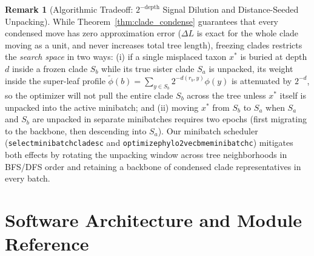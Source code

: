 \documentclass[11pt,a4paper]{article}
\makeatletter
\DeclareRobustCommand{\_}{\ifmmode\nfss@text{\textunderscore}\else\textunderscore\allowbreak\fi}
\theoremstyle{definition}
\newtheorem{remark}[theorem]{Remark}
\makeatother
\begin{document}
\begin{remark}[Algorithmic Tradeoff: $2^{-\text{depth}}$ Signal Dilution and Distance-Seeded Unpacking]
\label{rem:minibatch_tradeoffs}
While Theorem~\ref{thm:clade_condense} guarantees that every condensed move has zero approximation error ($\Delta L$ is exact for the whole clade moving as a unit, and never increases total tree length), freezing clades restricts the \emph{search space} in two ways: (i) if a single misplaced taxon $x^*$ is buried at depth $d$ inside a frozen clade $S_b$ while its true sister clade $S_a$ is unpacked, its weight inside the super-leaf profile $\widetilde{\phi}(b) = \sum_{y \in S_b} 2^{-d(r_b, y)} \phi(y)$ is attenuated by $2^{-d}$, so the optimizer will not pull the entire clade $S_b$ across the tree unless $x^*$ itself is unpacked into the active minibatch; and (ii) moving $x^*$ from $S_b$ to $S_a$ when $S_a$ and $S_b$ are unpacked in separate minibatches requires two epochs (first migrating to the backbone, then descending into $S_a$). Our minibatch scheduler (\texttt{select\_minibatch\_clades\_c} and \texttt{optimize\_phylo2vec\_bme\_minibatch\_c}) mitigates both effects by rotating the unpacking window across tree neighborhoods in BFS/DFS order and retaining a backbone of condensed clade representatives in every batch.
\end{remark}

\section{Software Architecture and Module Reference}
\label{sec:software}
\end{document}
